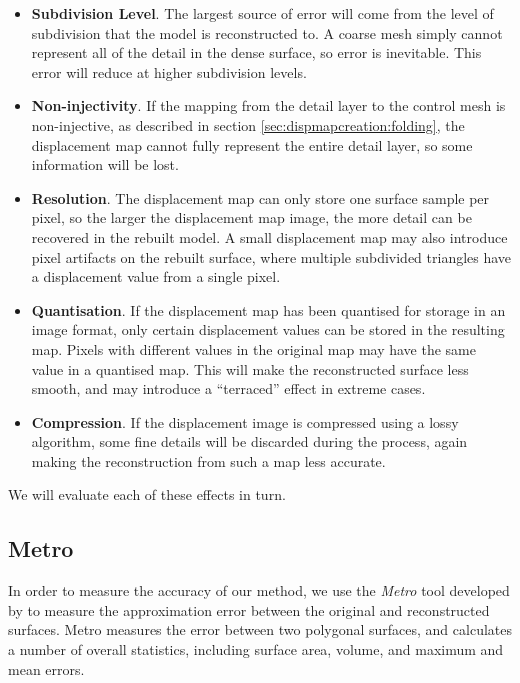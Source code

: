 \begin{itemize}
\item {\bf Subdivision Level}. The largest source of error will come from the level of subdivision that the model is reconstructed to. A coarse mesh simply cannot represent all of the detail in the dense surface, so error is inevitable. This error will reduce at higher subdivision levels.
\item {\bf Non-injectivity}. If the mapping from the detail layer to the control mesh is non-injective, as described in section \ref{sec:dispmapcreation:folding}, the displacement map cannot fully represent the entire detail layer, so some information will be lost.
\item {\bf Resolution}. The displacement map can only store one surface sample per pixel, so the larger the displacement map image, the more detail can be recovered in the rebuilt model. A small displacement map may also introduce pixel artifacts on the rebuilt surface, where multiple subdivided triangles have a displacement value from a single pixel.
\item {\bf Quantisation}. If the displacement map has been quantised for storage in an image format, only certain displacement values can be stored in the resulting map. Pixels with different values in the original map may have the same value in a quantised map. This will make the reconstructed surface less smooth, and may introduce a ``terraced'' effect in extreme cases.
\item {\bf Compression}. If the displacement image is compressed using a lossy algorithm, some fine details will be discarded during the process, again making the reconstruction from such a map less accurate.
\end{itemize}

We will evaluate each of these effects in turn.

\subsection{\label{sec:dispmapanim:reconstructionresults:metro}Metro}

In order to measure the accuracy of our method, we use the {\it Metro} tool developed by \citet{Cignoni98a} to measure the approximation error between the original and reconstructed surfaces. Metro measures the error between two polygonal surfaces, and calculates a number of overall statistics, including surface area, volume, and maximum and mean errors. 

